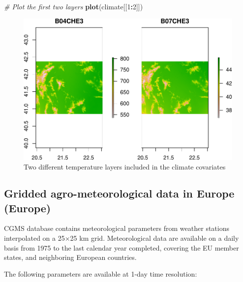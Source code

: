 \documentclass[10pt,b5paper,]{book}
\newenvironment{Shaded}{\begin{snugshade}}{\end{snugshade}}
\newcommand{\CommentTok}[1]{\textcolor[rgb]{0.56,0.35,0.01}{\textit{#1}}}
\newcommand{\DecValTok}[1]{\textcolor[rgb]{0.00,0.00,0.81}{#1}}
\newcommand{\KeywordTok}[1]{\textcolor[rgb]{0.13,0.29,0.53}{\textbf{#1}}}
\newcommand{\NormalTok}[1]{#1}
\newcommand{\OperatorTok}[1]{\textcolor[rgb]{0.81,0.36,0.00}{\textbf{#1}}}
\theoremstyle{definition}
\theoremstyle{definition}
\theoremstyle{definition}
\theoremstyle{remark}
\begin{document}
\begin{Shaded}
\begin{Highlighting}[]
\CommentTok{# Plot the first two layers}
\KeywordTok{plot}\NormalTok{(climate[[}\DecValTok{1}\OperatorTok{:}\DecValTok{2}\NormalTok{]])}
\end{Highlighting}
\end{Shaded}

\begin{figure}
\centering
\includegraphics{SOCMapping_files/figure-latex/unnamed-chunk-23-1.pdf}
\caption{\label{fig:unnamed-chunk-23}Two different temperature layers
included in the climate covariates}
\end{figure}

\hypertarget{gridded-agro-meteorological-data-in-europe-europe}{%
\subsection{Gridded agro-meteorological data in Europe
(Europe)}\label{gridded-agro-meteorological-data-in-europe-europe}}

CGMS database contains meteorological parameters from weather stations
interpolated on a 25×25 km grid. Meteorological data are available on a
daily basis from 1975 to the last calendar year completed, covering the
EU member states, and neighboring European countries.

The following parameters are available at 1-day time resolution:
\end{document}
